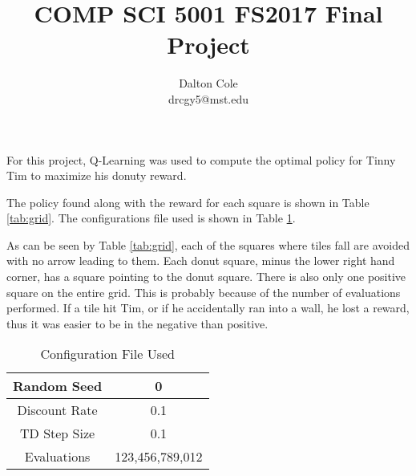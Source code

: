 \documentclass[times]{article}
\begin{document}
	\title{COMP SCI 5001 FS2017 Final Project}
	\author{Dalton Cole \\ drcgy5@mst.edu}
	\date{}
	\maketitle
  
	For this project, Q-Learning was used to compute the optimal policy for Tinny Tim to maximize his donuty reward.

	The policy found along with the reward for each square is shown in Table \ref{tab:grid}. The configurations file used is shown in Table \ref{tab:conf}.

	As can be seen by Table \ref{tab:grid}, each of the squares where tiles fall are avoided with no arrow leading to them. Each donut square, minus the lower right hand corner, has a square pointing to the donut square. There is also only one positive square on the entire grid. This is probably because of the number of evaluations performed. If a tile hit Tim, or if he accidentally ran into a wall, he lost a reward, thus it was easier to be in the negative than positive.

	\begin{table}
		\centering
		\caption{Configuration File Used}
		\label{tab:conf}
		\begin{tabular}{| c | c |}
			\hline
			Random Seed & 0 \\
			\hline
			Discount Rate & 0.1 \\
			\hline
			TD Step Size & 0.1 \\
			\hline
			Evaluations & 123,456,789,012 \\
			\hline
		\end{tabular}
	\end{table}

	

		
\end{document}
